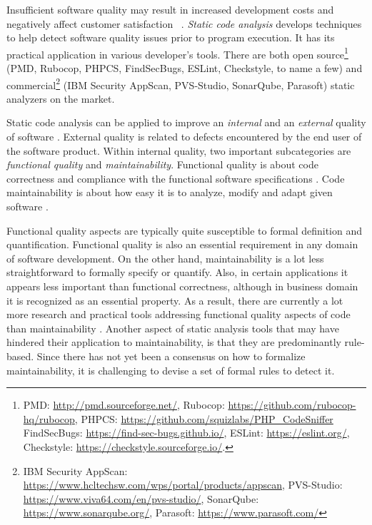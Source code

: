 
Insufficient software quality may result in increased development costs and
negatively affect customer satisfaction ~\citep{The_Economics_of_Software_Quality}.
\textit{Static code analysis} develops techniques to help detect software quality
issues prior to program execution. It has its practical application in various developer's tools. There are both open source\footnote{PMD: \url{http://pmd.sourceforge.net/}, Rubocop: \url{https://github.com/rubocop-hq/rubocop},
PHPCS: \url{https://github.com/squizlabs/PHP_CodeSniffer}
FindSecBugs: \url{https://find-sec-bugs.github.io/}, ESLint: \url{https://eslint.org/}, Checkstyle: \url{https://checkstyle.sourceforge.io/}.}
(PMD, Rubocop, PHPCS, FindSecBugs, ESLint, Checkstyle, to name a few) and commercial\footnote{IBM Security AppScan: \url{https://www.hcltechsw.com/wps/portal/products/appscan},
PVS-Studio: \url{https://www.viva64.com/en/pvs-studio/},
SonarQube: \url{https://www.sonarqube.org/},
Parasoft: \url{https://www.parasoft.com/}}
(IBM Security AppScan, PVS-Studio, SonarQube, Parasoft) static analyzers
on the market.

Static code analysis can be applied to improve an \textit{internal} and an
\textit{external} quality of software \citep{Ilyas2016StaticCA}. External
quality is related to defects encountered by the end user of the software
product. Within internal quality, two important subcategories are
\textit{functional quality} and \textit{maintainability}. Functional quality is
about code correctness and compliance with the functional software
specifications \citep{Farhan}. Code maintainability is about how easy it is to
analyze, modify and adapt given software \citep{Mohammadi2013AnAO}.

Functional quality aspects are typically quite susceptible to formal definition
and quantification.
Functional quality is also an essential
requirement in any domain of software development. On the other hand,
maintainability is a lot less straightforward to formally specify or quantify.
Also, in certain applications it appears less important than
functional correctness, although in business domain it is recognized as an
essential property.
As a result, there are currently a lot more
research and practical tools addressing functional quality aspects of code than
maintainability \citep{Overview_Static_Code_Analysis_in_Software_Development}.
Another aspect of static analysis tools that may have hindered their application
to maintainability, is that they are predominantly rule-based. Since there has
not yet been a consensus on how to formalize maintainability, it is challenging
to devise a set of formal rules to detect it.

